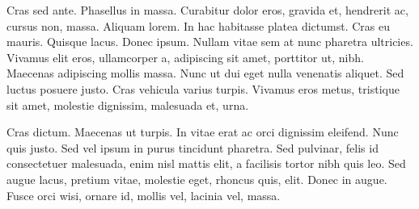 Cras sed ante. Phasellus in massa. Curabitur dolor eros, gravida et, hendrerit
ac, cursus non, massa. Aliquam lorem. In hac habitasse platea dictumst. Cras eu
mauris. Quisque lacus. Donec ipsum. Nullam vitae sem at nunc pharetra
ultricies. Vivamus elit eros, ullamcorper a, adipiscing sit amet, porttitor ut,
nibh. Maecenas adipiscing mollis massa. Nunc ut dui eget nulla venenatis
aliquet. Sed luctus posuere justo. Cras vehicula varius turpis. Vivamus eros
metus, tristique sit amet, molestie dignissim, malesuada et, urna.

Cras dictum. Maecenas ut turpis. In vitae erat ac orci dignissim eleifend. Nunc
quis justo. Sed vel ipsum in purus tincidunt pharetra. Sed pulvinar, felis id
consectetuer malesuada, enim nisl mattis elit, a facilisis tortor nibh quis
leo. Sed augue lacus, pretium vitae, molestie eget, rhoncus quis, elit. Donec
in augue. Fusce orci wisi, ornare id, mollis vel, lacinia vel, massa.


